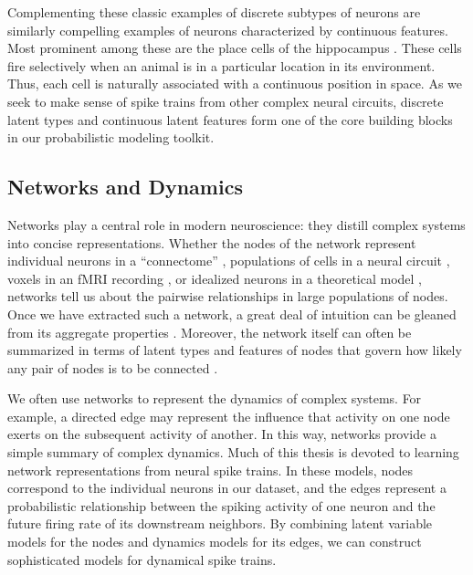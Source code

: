 Complementing these classic examples of discrete subtypes of neurons 
are similarly compelling examples of neurons characterized by 
continuous features. Most prominent among these are the place cells 
of the hippocampus \cite{OKeefe78}. These cells fire selectively 
when an animal is in a particular location in its environment. Thus,
each cell is naturally associated with a continuous position in 
space. As we seek to make sense of spike trains from other complex neural circuits, 
discrete latent types and continuous latent features form one of the
core building blocks in our probabilistic modeling toolkit. 


\subsection{Networks and Dynamics}
Networks play a central role in modern neuroscience: they distill
complex systems into concise representations. Whether the
nodes of the network represent individual neurons in a ``connectome''
\cite[e.g.]{sporns2005human}, populations of cells in a neural circuit
\cite[e.g.]{felleman1991distributed}, voxels in an fMRI recording
\cite[e.g.]{friston1994functional}, or idealized neurons in a
theoretical model \cite[e.g.]{hopfield1982neural}, networks tell us
about the pairwise relationships in large populations of nodes.  Once we have 
extracted such a network, a great deal of intuition can be gleaned 
from its aggregate properties \cite{bullmore2009complex, newman2003structure}.
Moreover, the network itself can often be summarized in terms of 
latent types and features of nodes that govern how likely any 
pair of nodes is to be connected \cite{Goldenberg-2010}.

We often use networks to represent the dynamics of complex systems.
For example, a directed edge may represent the influence that activity
on one node exerts on the subsequent activity of another. In this way,
networks provide a simple summary of complex dynamics. Much of this 
thesis is devoted to learning network representations from neural 
spike trains. In these models, nodes correspond to the individual 
neurons in our dataset, and the edges represent a probabilistic 
relationship between the spiking activity of one neuron and the 
future firing rate of its downstream neighbors.  By combining 
latent variable models for the nodes and dynamics models for its edges, 
we can construct sophisticated models for dynamical spike trains.



